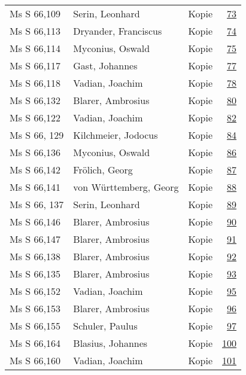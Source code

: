 \documentclass[10pt,a4paper,landscape]{report}
\begin{document}
\begin{longtable}{p{16cm}p{4cm}lr}
Ms S 66,109	&	Serin, Leonhard	&	Kopie	&	\href{http://130.60.24.72/assignment/73}{73}\\
Ms S 66,113	&	Dryander, Franciscus	&	Kopie	&	\href{http://130.60.24.72/assignment/74}{74}\\
Ms S 66,114	&	Myconius, Oswald	&	Kopie	&	\href{http://130.60.24.72/assignment/75}{75}\\
Ms S 66,117	&	Gast, Johannes	&	Kopie	&	\href{http://130.60.24.72/assignment/77}{77}\\
Ms S 66,118	&	Vadian, Joachim	&	Kopie	&	\href{http://130.60.24.72/assignment/78}{78}\\
Ms S 66,132	&	Blarer, Ambrosius	&	Kopie	&	\href{http://130.60.24.72/assignment/80}{80}\\
Ms S 66,122	&	Vadian, Joachim	&	Kopie	&	\href{http://130.60.24.72/assignment/82}{82}\\
Ms S 66, 129	&	Kilchmeier, Jodocus	&	Kopie	&	\href{http://130.60.24.72/assignment/84}{84}\\
Ms S 66,136	&	Myconius, Oswald	&	Kopie	&	\href{http://130.60.24.72/assignment/86}{86}\\
Ms S 66,142	&	Frölich, Georg	&	Kopie	&	\href{http://130.60.24.72/assignment/87}{87}\\
Ms S 66,141	&	von Württemberg, Georg	&	Kopie	&	\href{http://130.60.24.72/assignment/88}{88}\\
Ms S 66, 137	&	Serin, Leonhard	&	Kopie	&	\href{http://130.60.24.72/assignment/89}{89}\\
Ms S 66,146	&	Blarer, Ambrosius	&	Kopie	&	\href{http://130.60.24.72/assignment/90}{90}\\
Ms S 66,147	&	Blarer, Ambrosius	&	Kopie	&	\href{http://130.60.24.72/assignment/91}{91}\\
Ms S 66,138	&	Blarer, Ambrosius	&	Kopie	&	\href{http://130.60.24.72/assignment/92}{92}\\
Ms S 66,135	&	Blarer, Ambrosius	&	Kopie	&	\href{http://130.60.24.72/assignment/93}{93}\\
Ms S 66,152	&	Vadian, Joachim	&	Kopie	&	\href{http://130.60.24.72/assignment/95}{95}\\
Ms S 66,153	&	Blarer, Ambrosius	&	Kopie	&	\href{http://130.60.24.72/assignment/96}{96}\\
Ms S 66,155	&	Schuler, Paulus	&	Kopie	&	\href{http://130.60.24.72/assignment/97}{97}\\
Ms S 66,164	&	Blasius, Johannes	&	Kopie	&	\href{http://130.60.24.72/assignment/100}{100}\\
Ms S 66,160	&	Vadian, Joachim	&	Kopie	&	\href{http://130.60.24.72/assignment/101}{101}\\

\end{longtable}
\end{document}
